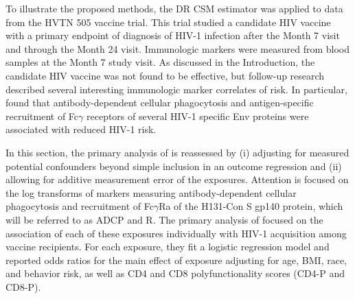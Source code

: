 \documentclass[useAMS,usenatbib,referee]{biom}
\newcommand{\RNum}[1]{\uppercase\expandafter{\romannumeral #1\relax}}
\begin{document}
To illustrate the proposed methods, the DR CSM estimator was applied to data from the HVTN 505 vaccine trial. This trial studied a candidate HIV vaccine with a primary endpoint of diagnosis of HIV-1 infection after the Month 7 visit and through the Month 24 visit. Immunologic markers were measured from blood samples at the Month 7 study visit. As discussed in the Introduction, the candidate HIV vaccine was not found to be effective, but follow-up research described several interesting immunologic marker correlates of risk. In particular, \citet{neidich2019} found that antibody-dependent cellular phagocytosis and antigen-specific recruitment of Fc$\gamma$ receptors of several HIV-1 specific Env proteins were associated with reduced HIV-1 risk.

In this section, the primary analysis of \citet{neidich2019} is reassessed by (i) adjusting for measured potential confounders beyond simple inclusion in an outcome regression and (ii) allowing for additive measurement error of the exposures. Attention is focused on the log transforms of markers measuring antibody-dependent cellular phagocytosis and recruitment of Fc$\gamma$R\RNum{2}a of the H131-Con S gp140 protein, which will be referred to as ADCP and R\RNum{2}. The primary analysis of \citet{neidich2019} focused on the association of each of these exposures individually with HIV-1 acquisition among vaccine recipients. For each exposure, they fit a logistic regression model and reported odds ratios for the main effect of exposure adjusting for age, BMI, race, and behavior risk, as well as CD4 and CD8 polyfunctionality scores (CD4-P and CD8-P).
\end{document}
